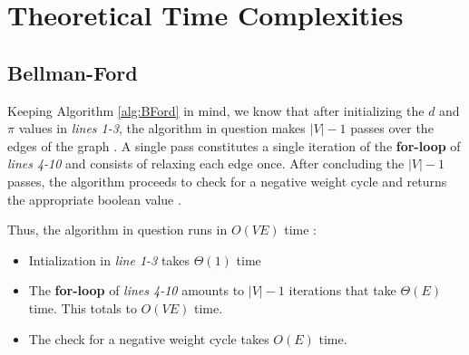 \documentclass[a4paper, 12pt]{report}
\theoremstyle{definition}
\begin{document}
\chapter{Theoretical Time Complexities}
\section{Bellman-Ford}
Keeping Algorithm \ref{alg:BFord} in mind, we know that after initializing the \(d\) and \(\pi\) values in \emph{lines 1-3}, the algorithm in question
makes  \(|V| - 1\) passes over the edges of the graph \cite{cormenBk}. A single pass constitutes a single iteration of the \textbf{for-loop} of \emph{lines 4-10} and consists
of relaxing each edge once. After concluding the \(|V| - 1\) passes, the algorithm proceeds to check for a negative weight cycle and returns the appropriate boolean value \cite{cormenBk}.

Thus, the algorithm in question runs in \(O(VE)\) time \cite{cormenBk,stand:bford:11,toyota:2019}:
\begin{itemize}
  \item Intialization in \emph{line 1-3} takes \(\Theta(1)\) time
  \item The \textbf{for-loop} of \emph{lines 4-10} amounts to \(|V| - 1\) iterations that take \(\Theta(E)\) time. This totals to \(O(VE)\) time.
  \item The check for a negative weight cycle takes \(O(E)\) time.  
\end{itemize}
\end{document}
